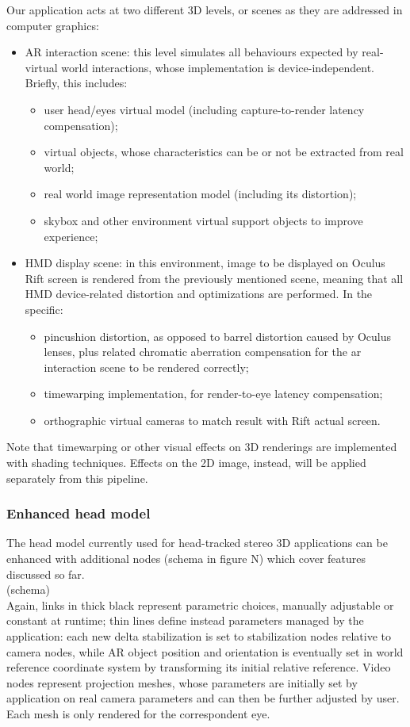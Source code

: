 Our application acts at two different 3D levels, or scenes as they are addressed in computer graphics:
\begin{itemize}
\item AR interaction scene: this level simulates all behaviours expected by real-virtual world interactions, whose implementation is device-independent. Briefly, this includes:
\begin{itemize}
\item user head/eyes virtual model (including capture-to-render latency compensation);
\item virtual objects, whose characteristics can be or not be extracted from real world;
\item real world image representation model (including its distortion);
\item skybox and other environment virtual support objects to improve experience;
\end{itemize}
\item HMD display scene: in this environment, image to be displayed on Oculus Rift screen is rendered from the previously mentioned scene, meaning that all HMD device-related distortion and optimizations are performed. In the specific:
\begin{itemize}
\item pincushion distortion, as opposed to barrel distortion caused by Oculus lenses, plus related chromatic aberration compensation for the ar interaction scene to be rendered correctly;
\item timewarping implementation, for render-to-eye latency compensation;
\item orthographic virtual cameras to match result with Rift actual screen.
\end{itemize}
\end{itemize}
Note that timewarping or other visual effects on 3D renderings are implemented with shading techniques. Effects on the 2D image, instead, will be applied separately from this pipeline.

\subsubsection{Enhanced head model}
The head model currently used for head-tracked stereo 3D applications can be enhanced with additional nodes (schema in figure N) which cover features discussed so far.\\
(schema)\\
Again, links in thick black represent parametric choices, manually adjustable or constant at runtime; thin lines define instead parameters managed by the application: each new delta stabilization is set to stabilization nodes relative to camera nodes, while AR object position and orientation is eventually set in world reference coordinate system by transforming its initial relative reference. Video nodes represent projection meshes, whose parameters are initially set by application on real camera parameters and can then be further adjusted by user. Each mesh is only rendered for the correspondent eye.

